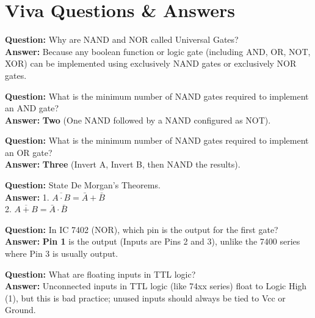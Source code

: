\section{Viva Questions \& Answers}

\begin{vivaqa}
\textbf{Question:} Why are NAND and NOR called Universal Gates?\\[4pt]
\textbf{Answer:} Because any boolean function or logic gate (including AND, OR, NOT, XOR) can be implemented using exclusively NAND gates or exclusively NOR gates.
\end{vivaqa}

\begin{vivaqa}
\textbf{Question:} What is the minimum number of NAND gates required to implement an AND gate?\\[4pt]
\textbf{Answer:} \textbf{Two} (One NAND followed by a NAND configured as NOT).
\end{vivaqa}

\begin{vivaqa}
\textbf{Question:} What is the minimum number of NAND gates required to implement an OR gate?\\[4pt]
\textbf{Answer:} \textbf{Three} (Invert A, Invert B, then NAND the results).
\end{vivaqa}

\begin{vivaqa}
\textbf{Question:} State De Morgan's Theorems.\\[4pt]
\textbf{Answer:}
1. $\overline{A \cdot B} = \bar{A} + \bar{B}$\\
2. $\overline{A + B} = \bar{A} \cdot \bar{B}$
\end{vivaqa}

\begin{vivaqa}
\textbf{Question:} In IC 7402 (NOR), which pin is the output for the first gate?\\[4pt]
\textbf{Answer:} \textbf{Pin 1} is the output (Inputs are Pins 2 and 3), unlike the 7400 series where Pin 3 is usually output.
\end{vivaqa}

\begin{vivaqa}
\textbf{Question:} What are floating inputs in TTL logic?\\[4pt]
\textbf{Answer:} Unconnected inputs in TTL logic (like 74xx series) float to Logic High (1), but this is bad practice; unused inputs should always be tied to Vcc or Ground.
\end{vivaqa}
